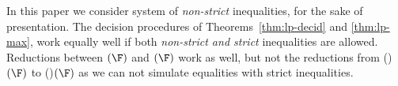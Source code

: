 
In this paper we consider system of \emph{non-strict} inequalities, for the sake of presentation.
The decision procedures of 
Theorems~\ref{thm:lp-decid} and \ref{thm:lp-max}, work equally well if both \emph{non-strict and strict} inequalities are
allowed.
Reductions between \finineqsolvname$(\F)$ and \ineqsolvname$(\F)$ work as well, but not the reductions
from (\finname)\nonnegsolvname$(\F)$ to (\finname)\ineqsolvname$(\F)$
as we can not simulate equalities with strict inequalities.
%

